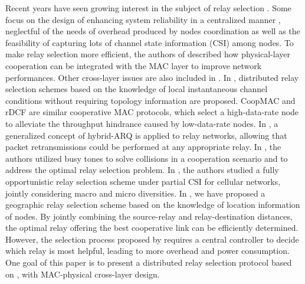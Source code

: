 \documentclass[journal,twoside,final]{IEEEtran}
\begin{document}
Recent years have seen growing interest in the subject of relay selection \cite{shan2009,Ng2007,YK2008,Ibrahim2008,syue09,Liu2006,Beres2008,Bletsas2005,Gletsas2006,Guo2008, Liu2005,Zhu2006,Zhao2005,CTBTMA08,Gokturk2009,Yu2010,Wei2010}.
Some focus on the design of enhancing system reliability in a centralized manner \cite{Ng2007,YK2008,Ibrahim2008,syue09}, neglectful of the needs of overhead produced by nodes coordination as well as the feasibility of capturing lots of channel state information (CSI) among nodes.
To make relay selection more efficient, the authors of \cite{Liu2006} described how physical-layer cooperation can be integrated with the MAC layer to improve network performances. Other cross-layer issues are also included in \cite{Liu2006}.
In \cite{Bletsas2005,Gletsas2006,Guo2008}, distributed relay selection schemes based on the knowledge of local instantaneous channel conditions without requiring topology information are proposed.
CoopMAC \cite{Liu2005} and rDCF \cite{Zhu2006} are similar cooperative MAC protocols, which select a high-data-rate node to alleviate the throughput hindrance caused by low-data-rate nodes.
In \cite{Zhao2005}, a generalized concept of hybrid-ARQ is applied to relay networks, allowing that packet retransmissions could be performed at any appropriate relay.
In \cite{CTBTMA08}, the authors utilized busy tones to solve collisions in a cooperation scenario and to address the optimal relay selection problem.
In \cite{Yu2010}, the authors studied a fully opportunistic relay selection scheme under partial CSI for cellular networks, jointly considering macro and micro diversities.
In \cite{syue09}, we have proposed a geographic relay selection scheme based on the knowledge of location information of nodes. By jointly combining the source-relay and relay-destination distances, the optimal relay offering the best cooperative link can be efficiently determined. However, the selection process proposed by \cite{syue09} requires a central controller to decide which relay is most helpful, leading to more overhead and power consumption. One goal of this paper is to present a distributed relay selection protocol based on \cite{syue09}, with MAC-physical cross-layer design.
\end{document}
